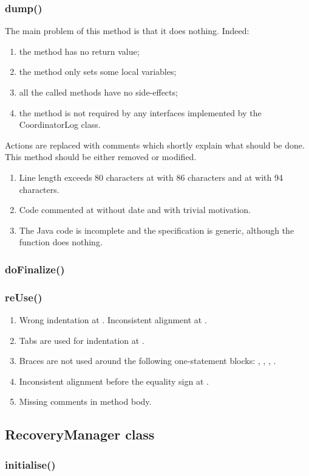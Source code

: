 \subsubsection{dump()}
The main problem of this method is that it does nothing.
Indeed:
\begin{enumerate}
    \item the method has no return value;
    \item the method only sets some local variables;
    \item all the called methods have no side-effects;
    \item the method is not required by any interfaces implemented by the CoordinatorLog class.
\end{enumerate}
Actions are replaced with comments which shortly explain what should be done.
This method should be either removed or modified.
\begin{enumerate}
	\item {} Line length exceeds 80 characters at  with 86 characters and at  with 94 characters.
	\item {} Code commented at  without date and with trivial motivation.
	\item {} The Java code is incomplete and the specification is generic, although the function does nothing.
\end{enumerate}

\subsubsection{doFinalize()}

\subsubsection{reUse()}
\begin{enumerate}
    \item {} Wrong indentation at . Inconsistent alignment at .
    \item {} Tabs are used for indentation at .
    \item {} Braces are not used around the following one-statement blocks: , , , .
    \item {} Inconsistent alignment before the equality sign at .
    \item {} Missing comments in method body.
\end{enumerate}


\subsection{RecoveryManager class}

\subsubsection{initialise()}
